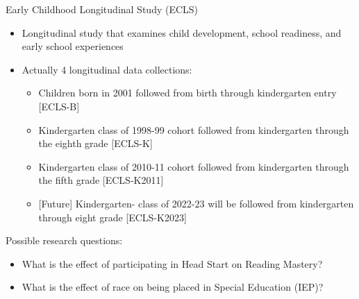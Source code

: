 \documentclass[
  8pt,
  ignorenonframetext,
  dvipsnames]{beamer}
\providecommand{\tightlist}{%
  \setlength{\itemsep}{0pt}\setlength{\parskip}{0pt}}
\let\olditem\item
\renewcommand{\item}{%
  \olditem\vspace{4pt}
}
\begin{document}
\begin{frame}{Early Childhood Longitudinal Study (ECLS)}
\protect\hypertarget{early-childhood-longitudinal-study-ecls}{}

\begin{itemize}
\tightlist
\item
  Longitudinal study that examines child development, school readiness,
  and early school experiences
\item
  Actually 4 longitudinal data collections:

  \begin{itemize}
  \tightlist
  \item
    Children born in 2001 followed from birth through kindergarten entry
    {[}ECLS-B{]}
  \item
    Kindergarten class of 1998-99 cohort followed from kindergarten
    through the eighth grade {[}ECLS-K{]}
  \item
    Kindergarten class of 2010-11 cohort followed from kindergarten
    through the fifth grade {[}ECLS-K2011{]}
  \item
    {[}Future{]} Kindergarten- class of 2022-23 will be followed from
    kindergarten through eight grade {[}ECLS-K2023{]}
  \end{itemize}
\end{itemize}

\medskip

Possible research questions:

\begin{itemize}
\tightlist
\item
  What is the effect of participating in Head Start on Reading Mastery?
\item
  What is the effect of race on being placed in Special Education (IEP)?
\end{itemize}

\end{frame}
\end{document}
